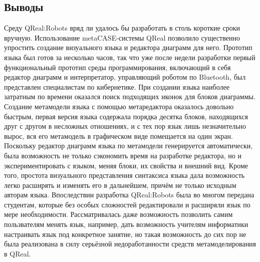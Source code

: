 \documentclass[a4paper]{article}
\begin{document}
\subsection{Выводы}
Среду QReal:Robots вряд ли удалось бы разработать в столь короткие сроки вручную. Использование metaCASE-системы QReal позволило существенно упростить создание визуального языка и редактора диаграмм для него. Прототип языка был готов за несколько часов, так что уже после недели разработки первый функциональный прототип среды программирования, включающий в себя редактор диаграмм и интерпретатор, управляющий роботом по Bluetooth, был представлен специалистам по кибернетике. При создании языка наиболее затратным по времени оказался поиск подходящих иконок для блоков диаграммы. Создание метамодели языка с помощью метаредактора оказалось довольно быстрым, первая версия языка содержала порядка десятка блоков, находящихся друг с другом в несложных отношениях, и с тех пор язык лишь незначительно вырос, вся его метамодель в графическом виде помещается на один экран. Поскольку редактор диаграмм языка по метамодели генерируется автоматически, была возможность не только сэкономить время на разработке редактора, но и экспериментировать с языком, меняя блоки, их свойства и внешний вид. Кроме того, простота визуального представления синтаксиса языка дала возможность легко расширять и изменять его в дальнейшем, причём не только исходным авторам языка. Впоследствии разработка QReal:Robots была во многом передана студентам, которые без особых сложностей редактировали и расширяли язык по мере необходимости. Рассматривалась даже возможность позволить самим пользвателям менять язык, например, дать возможность учителям информатики настраивать язык под конкретное занятие, но такая возможность до сих пор не была реализована в силу серьёзной недоработанности средств метамоделирования в QReal.
\end{document}
